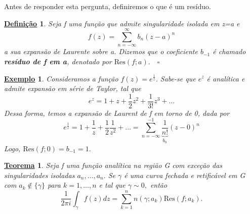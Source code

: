 \documentclass{article}
\newtheorem*{def*}{\underline{Defini\c c\~ao}}
\newtheorem*{theorem*}{\underline{Teorema}}
\newtheorem{example}{\underline{Exemplo}}[section]
\begin{document}
  Antes de responder esta pergunta, definiremos o que é um resíduo.
  \begin{def*}
    Seja f uma função que admite singularidade isolada em z=a e 
    \[
      f(z) = \sum\limits_{n=-\infty}^{\infty}b_{n}(z-a)^{n}
    \]
    a sua expansão de Laurente sobre a. Dizemos que o coeficiente \(b_{-1}\) é chamado \textbf{resíduo de f em a},
    denotado por \(\mathrm{Res}(f; a).\quad \square\)
  \end{def*}
  \begin{example}
    Consideramos a função \(f(z) = e^{\frac{1}{z}}.\) Sabe-se que \(e^{z}\) é analítica e admite expansão em série 
    de Taylor, tal que 
    \[
      e^{z} = 1 + z + \frac{1}{2}z^{2} + \frac{1}{3!}z^{3} + \dotsc
    \]
    Dessa forma, temos a expansão de Laurent de f em torno de 0, dada por 
    \[
      e^{\frac{1}{z}} = 1 + \frac{1}{z} + \frac{1}{2}\frac{1}{z^{2}}+\dotsc  = \sum\limits_{n=-\infty}^{-1}\underbrace{\frac{1}{n!}}_{b_{n}}(z-0)^{n}
    \]
    Logo, \(\mathrm{Res}(f; 0) = b_{-1} = 1.\)
  \end{example}
  \hypertarget{residue}{ \begin{theorem*}
      Seja f uma função analítica na região G com exceção das singularidades isoladas \(a_{n},\dotsc ,a_{n}.\) Se \(\gamma \) é uma curva fechada e retificável
      em G com \(a_{k}\not\in\{\gamma \}\) para \(k=1, \dotsc , n\) e tal que \(\gamma \sim 0,\) então 
      \[
        \frac{1}{2\pi i}\int_{\gamma }^{}f(z)dz = \sum\limits_{k=1}^{n}n(\gamma; a_{k})\mathrm{Res}(f; a_{k}).
      \]
  \end{theorem*}}
\end{document}
